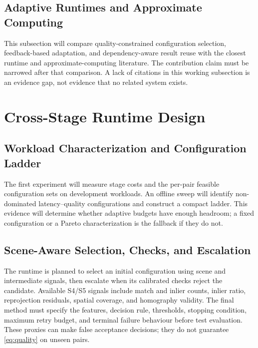 \documentclass[a4paper,UKenglish,cleveref,autoref,anonymous]{oasics-v2021}
\begin{document}
\subsection{Adaptive Runtimes and Approximate Computing}
This subsection will compare quality-constrained configuration selection,
feedback-based adaptation, and dependency-aware result reuse with the closest
runtime and approximate-computing literature. The contribution claim must be
narrowed after that comparison. A lack of citations in this working subsection
is an evidence gap, not evidence that no related system exists.

\section{Cross-Stage Runtime Design}
\label{sec:runtime}
\subsection{Workload Characterization and Configuration Ladder}
The first experiment will measure stage costs and the per-pair feasible
configuration sets on development workloads. An offline sweep will identify
non-dominated latency--quality configurations and construct a compact ladder.
This evidence will determine whether adaptive budgets have enough headroom;
a fixed configuration or a Pareto characterization is the fallback if they do not.

\subsection{Scene-Aware Selection, Checks, and Escalation}
The runtime is planned to select an initial configuration using scene and
intermediate signals, then escalate when its calibrated checks reject the
candidate. Available S4/S5 signals include match and inlier counts, inlier ratio,
reprojection residuals, spatial coverage, and homography validity. The final
method must specify the features, decision rule, thresholds, stopping condition,
maximum retry budget, and terminal failure behaviour before test evaluation.
These proxies can make false acceptance decisions; they do not guarantee
\cref{eq:quality} on unseen pairs.
\end{document}
